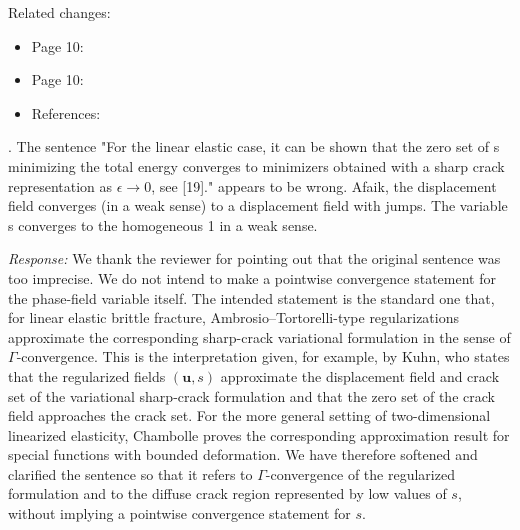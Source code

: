 \documentclass[pdflatex,sn-mathphys-num]{sn-jnl}
\begin{document}
Related changes:
\begin{itemize}
\item Page 10: 
\item Page 10: 
\item References: 
\end{itemize}

\bigskip

. The sentence "For the linear elastic case, it can be shown that the zero set of s minimizing the total energy converges to minimizers obtained with a sharp crack representation as $\epsilon \to 0$, see [19]." appears to be wrong. Afaik, the displacement field converges (in a weak sense) to a displacement field with jumps. The variable s converges to the homogeneous 1 in a weak sense.

\emph{Response:} We thank the reviewer for pointing out that the original sentence was too imprecise. We do not intend to make a pointwise convergence statement for the phase-field variable itself. The intended statement is the standard one that, for linear elastic brittle fracture, Ambrosio--Tortorelli-type regularizations approximate the corresponding sharp-crack variational formulation in the sense of $\Gamma$-convergence. This is the interpretation given, for example, by Kuhn, who states that the regularized fields $(\boldsymbol{u},s)$ approximate the displacement field and crack set of the variational sharp-crack formulation and that the zero set of the crack field approaches the crack set. For the more general setting of two-dimensional linearized elasticity, Chambolle proves the corresponding approximation result for special functions with bounded deformation. We have therefore softened and clarified the sentence so that it refers to $\Gamma$-convergence of the regularized formulation and to the diffuse crack region represented by low values of $s$, without implying a pointwise convergence statement for $s$.
\end{document}
